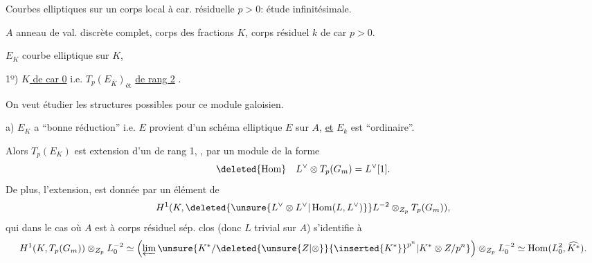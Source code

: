 Courbes elliptiques sur un  corps local à car. résiduelle $p>0$: étude infinitésimale.

$A$ anneau de val. discrète complet, corps des fractions $K$, corps résiduel $k$ de car $p>0$.

$E_K$ courbe elliptique sur $K$, 

1º) \uline{$K$ de car 0} i.e. $T_p(E_{\overline{K}})_{\text{ét}}$ \uline{de rang 2} .
\margin{\unsure{[}et $T_p(E_{\overline{K}})_{\text{ét}}=T_p(E_{\overline{K}})$]}

On veut étudier les structures possibles pour ce module galoisien.

a) $E_K$ a ``bonne réduction'' i.e. $E$ provient d'un schéma elliptique $E$ sur $A$, \uline{et} $E_k$ est ``ordinaire''.

Alors $T_p(E_K)$ est  extension d'un   de rang 1, , par un  module de la forme
\[
\deleted{\operatorname{Hom}}\quad L^{\vee}\otimes T_p(G_m)=L^{\vee}[1].
\]
De plus, l'extension,  est donnée par un élément de
\[
H^1(K,\deleted{\unsure{L^{\vee}\otimes L^{\vee}|\operatorname{Hom}(L,L^{\vee})}}L^{-2}\otimes_{Z_p}T_p(G_m)),
\]
qui dans le cas où $A$ est à corps résiduel sép. clos (donc $L$ trivial sur $A$) s'identifie à
\[
H^1(K,T_p(G_m))\otimes_{Z_p}L_0^{-2}
\simeq\left(\varprojlim\unsure{K^*/\deleted{\unsure{Z|\otimes}}{\inserted{K^*}}^{p^n}|K^*\otimes Z/p^n}\right)\otimes_{Z_p}L_0^{-2}
\simeq\operatorname{Hom}(L_0^2,\widehat{K^*}).
\]

